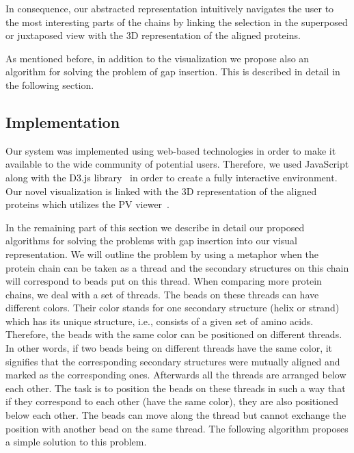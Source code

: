 \documentclass[twocolumn]{bmcart}%
\begin{document}
In consequence, our abstracted representation intuitively navigates the user to the most interesting parts of the chains by linking the selection in the superposed or juxtaposed view with the 3D representation of the aligned proteins. 

As mentioned before, in addition to the visualization we propose also an algorithm for solving the problem of gap insertion.
This is described in detail in the following section.


\subsection*{Implementation}
Our system was implemented using web-based technologies in order to make it available to the wide community of potential users.
Therefore, we used JavaScript along with the D3.js library~\cite{d3} in order to create a fully interactive environment.
Our novel visualization is linked with the 3D representation of the aligned proteins which utilizes the PV viewer~\cite{biasini2014}. 

In the remaining part of this section we describe in detail our proposed algorithms for solving the problems with gap insertion into our visual representation.
We will outline the problem by using a metaphor when the protein chain can be taken as a thread and the secondary structures on this chain will correspond to beads put on this thread.
When comparing more protein chains, we deal with a set of threads. 
The beads on these threads can have different colors. 
Their color stands for one secondary structure (helix or strand) which has its unique structure, i.e., consists of a given set of amino acids.
Therefore, the beads with the same color can be positioned on different threads.
In other words, if two beads being on different threads have the same color, it signifies that the corresponding secondary structures were mutually aligned and marked as the corresponding ones. 
Afterwards all the threads are arranged below each other.
The task is to position the beads on these threads in such a way that if they correspond to each other (have the same color), they are also positioned below each other. 
The beads can move along the thread but cannot exchange the position with another bead on the same thread.
The following algorithm proposes a simple solution to this problem.

\end{document}
